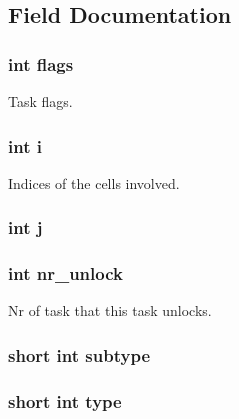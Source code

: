 \subsection{Field Documentation}
\hypertarget{structtask__cuda_ac8bf36fe0577cba66bccda3a6f7e80a4}{
\subsubsection[{flags}]{\setlength{\rightskip}{0pt plus 5cm}int flags}}\label{structtask__cuda_ac8bf36fe0577cba66bccda3a6f7e80a4}
Task flags. \hypertarget{structtask__cuda_acb559820d9ca11295b4500f179ef6392}{
\subsubsection[{i}]{\setlength{\rightskip}{0pt plus 5cm}int i}}\label{structtask__cuda_acb559820d9ca11295b4500f179ef6392}
Indices of the cells involved. \hypertarget{structtask__cuda_a37d972ae0b47b9099e30983131d31916}{
\subsubsection[{j}]{\setlength{\rightskip}{0pt plus 5cm}int j}}\label{structtask__cuda_a37d972ae0b47b9099e30983131d31916}
\hypertarget{structtask__cuda_a060ca3576648f40a2488d5b81ff5bb8e}{
\subsubsection[{nr\-\_\-unlock}]{\setlength{\rightskip}{0pt plus 5cm}int nr\-\_\-unlock}}\label{structtask__cuda_a060ca3576648f40a2488d5b81ff5bb8e}
Nr of task that this task unlocks. \hypertarget{structtask__cuda_af211cd3d9a83521309369c8e3f3ed87d}{
\subsubsection[{subtype}]{\setlength{\rightskip}{0pt plus 5cm}short int subtype}}\label{structtask__cuda_af211cd3d9a83521309369c8e3f3ed87d}
\hypertarget{structtask__cuda_aaa8ba4297d83f2cce5af75b18564ae13}{
\subsubsection[{type}]{\setlength{\rightskip}{0pt plus 5cm}short int type}}\label{structtask__cuda_aaa8ba4297d83f2cce5af75b18564ae13}
